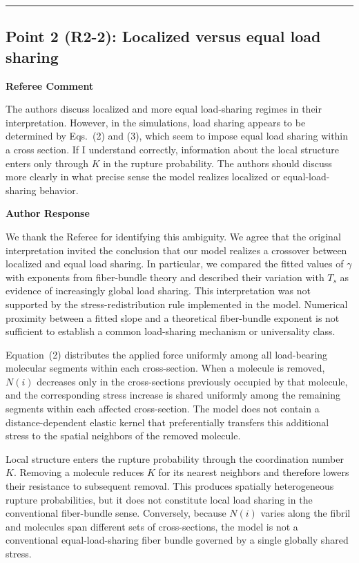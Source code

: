 \documentclass[11pt]{article}
\newenvironment{refereecomment}
  {%
    \par
    \begingroup
    \color{commentgray}
    \itshape
    \setlength{\leftskip}{1.4em}
    \setlength{\rightskip}{1.4em}
  }
  {%
    \par
    \endgroup
  }
\newcommand{\refereelabel}{%
  \par\smallskip
  {\color{commentgray}\bfseries Referee Comment}\par
}
\newcommand{\responselabel}{%
  \par\medskip
  {\color{responseblue}\bfseries Author Response}\par
}
\newcommand{\pointseparator}{%
  \par\bigskip
  {\color{rulegray}\hrule}
  \par\bigskip
}
\begin{document}
\pointseparator

\subsection*{Point 2 (R2-2): Localized versus equal load sharing}

\refereelabel
\begin{refereecomment}
The authors discuss localized and more equal load-sharing regimes in their
interpretation. However, in the simulations, load sharing appears to be
determined by Eqs.~(2) and (3), which seem to impose equal load sharing within
a cross section. If I understand correctly, information about the local
structure enters only through \(K\) in the rupture probability. The authors
should discuss more clearly in what precise sense the model realizes localized
or equal-load-sharing behavior.
\end{refereecomment}

\responselabel
We thank the Referee for identifying this ambiguity. We agree that the original
interpretation invited the conclusion that our model realizes a crossover
between localized and equal load sharing. In particular, we compared the
fitted values of \(\gamma\) with exponents from fiber-bundle theory and
described their variation with \(T_s\) as evidence of increasingly global load
sharing. This interpretation was not supported by the stress-redistribution
rule implemented in the model. Numerical proximity between a fitted slope and
a theoretical fiber-bundle exponent is not sufficient to establish a common
load-sharing mechanism or universality class.

Equation~(2) distributes the applied force uniformly among all load-bearing
molecular segments within each cross-section. When a molecule is removed,
\(N(i)\) decreases only in the cross-sections previously occupied by that
molecule, and the corresponding stress increase is shared uniformly among the
remaining segments within each affected cross-section. The model does not
contain a distance-dependent elastic kernel that preferentially transfers this
additional stress to the spatial neighbors of the removed molecule.

Local structure enters the rupture probability through the coordination number
\(K\). Removing a molecule reduces \(K\) for its nearest neighbors and therefore
lowers their resistance to subsequent removal. This produces spatially
heterogeneous rupture probabilities, but it does not constitute local load
sharing in the conventional fiber-bundle sense. Conversely, because \(N(i)\)
varies along the fibril and molecules span different sets of cross-sections,
the model is not a conventional equal-load-sharing fiber bundle governed by a
single globally shared stress.
\end{document}
